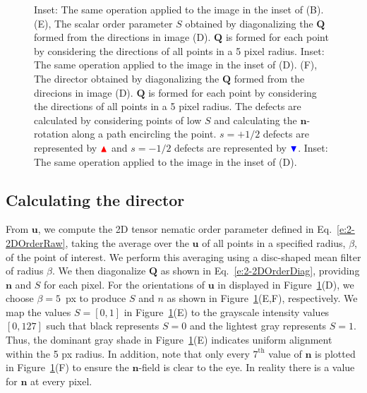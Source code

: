 \begin{figure}[H]
{Inset: The same operation applied to the image in the inset of (B).
(E), The scalar order parameter $S$ obtained by diagonalizing the $\mathbf{Q}$ formed from the directions in image (D).
$\mathbf{Q}$ is formed for each point by considering the directions of all points in a 5 pixel radius.
Inset: The same operation applied to the image in the inset of (D).
(F), The director obtained by diagonalizing the $\mathbf{Q}$ formed from the direcions in image (D).
$\mathbf{Q}$ is formed for each point by considering the directions of all points in a 5 pixel radius.
The defects are calculated by considering points of low $S$ and calculating the $\mathbf{n}$-rotation along a path encircling the point.
$s = +1/2$ defects are represented by ${\color{red} \blacktriangle  } $  and $s = -1/2$ defects are represented by ${ \color{blue} \blacktriangledown  } $.
Inset: The same operation applied to the image in the inset of (D).}\label{f:3-CEDF2}
\end{figure}
\newpage
\subsection{Calculating the director}
From $\mathbf{u}$, we compute the 2D tensor nematic order parameter defined in Eq.~\ref{e:2-2DOrderRaw}, taking the average over the $\mathbf{u}$ of all points in a specified radius, $\beta$, of the point of interest.
We perform this averaging using a disc-shaped mean filter of radius $\beta$.
We then diagonalize $\mathbf{Q}$ as shown in Eq.~\ref{e:2-2DOrderDiag}, providing $\mathbf{n}$ and $S$ for each pixel.
For the orientations of $\mathbf{u}$ in displayed in Figure~\ref{f:3-CEDF2}(D), we choose $\beta = 5$~px to produce $S$ and $n$ as shown in Figure~\ref{f:3-CEDF2}(E,F), respectively.
We map the values $S = [0, 1]$ in Figure~\ref{f:3-CEDF2}(E) to the grayscale intensity values $[0,127]$ such that black represents $S = 0$ and the lightest gray represents $S = 1$.
Thus, the dominant gray shade in Figure~\ref{f:3-CEDF2}(E) indicates uniform alignment within the 5 px radius.
In addition, note that only every $7^{\textrm{th}}$ value of $\mathbf{n}$ is plotted in Figure~\ref{f:3-CEDF2}(F) to ensure the $\mathbf{n}$-field is clear to the eye.
In reality there is a value for $\mathbf{n}$ at every pixel.

